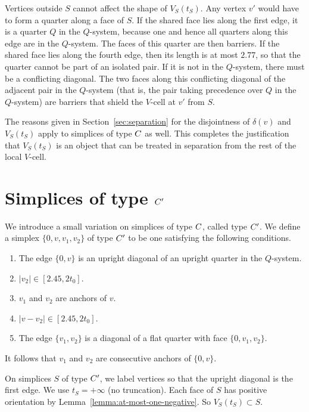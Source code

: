 Vertices outside $S$ cannot affect the shape of $V_S(t_S)$.  Any
vertex $v'$ would have to form a quarter along a face of $S$.  If
the shared face lies along the first edge, it is a quarter $Q$ in
the $Q$-system, because one and hence all quarters along this edge
are in the $Q$-system.  The faces of this quarter are then
barriers. If the shared face lies along the fourth edge, then its
length is at most $2.77$, so that the quarter cannot be part of an
isolated pair. If it is not in the $Q$-system, there must be a
conflicting diagonal. The two faces along this conflicting
diagonal of the adjacent pair in the $Q$-system (that is, the pair
taking precedence over $Q$ in the $Q$-system) are barriers that
shield the $V$-cell at $v'$ from $S$.

The reasons given in Section~\ref{sec:separation} for the
disjointness of $\delta(v)$ and $V_S(t_S)$ apply to simplices of
type $C$ as well. This completes the justification that
$V_S(t_S)$ is an object that can be treated in separation from the
rest of the local $V$-cell.

\section{Simplices of type $C' $}

We introduce a small variation on simplices of type $C$, called
type $C' $.  We define a simplex $\{0,v,v_1,v_2\}$ of type $C' $
to be one satisfying the following conditions.
    \begin{enumerate}
    \item The edge $\{0,v\}$ is an upright diagonal of an upright quarter
        in the $Q$-system.
    \item $|v_2|\in[2.45,2t_0]$.
    \item $v_1$ and $v_2$ are anchors of $v$.
    \item $|v-v_2|\in [2.45,2t_0]$.
    \item The edge $\{v_1,v_2\}$
    is a diagonal of a flat quarter with face $\{0,v_1,v_2\}$.
    \end{enumerate}

It follows that $v_1$ and $v_2$ are consecutive anchors of
$\{0,v\}$.

On simplices $S$ of type $C' $, we label vertices so that the
upright diagonal is the first edge.  We use $t_S=+\infty$ (no
truncation).  Each face of $S$ has positive orientation by
Lemma~\ref{lemma:at-most-one-negative}. So $V_S(t_S)\subset S$.

